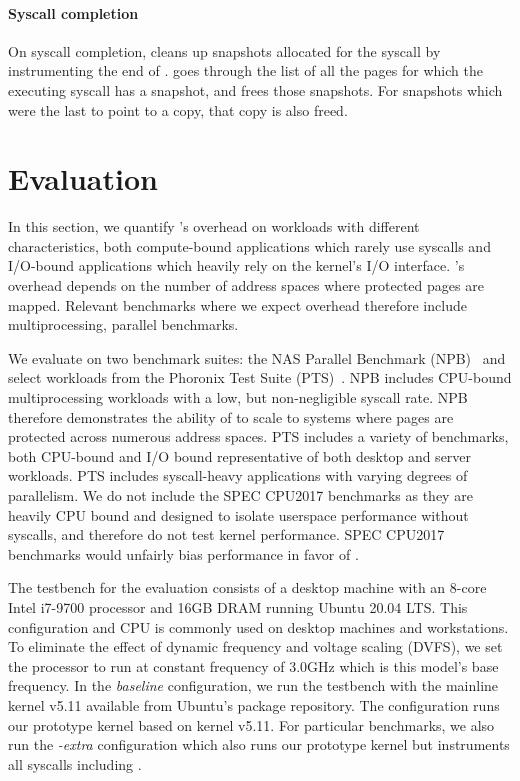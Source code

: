 \documentclass[letterpaper,twocolumn,10pt, anonymous]{article}
\begin{document}
\paragraph{Syscall completion}
On syscall completion, \tiktok cleans up snapshots allocated for 
the syscall by instrumenting the end of .
\tiktok goes through the list of all the pages for which the 
executing syscall has a snapshot, and frees those snapshots.
For snapshots which were the last to point to a copy, that 
copy is also freed.


\section{Evaluation}

In this section, we quantify \tiktok's overhead on workloads 
with different characteristics, both compute-bound applications
which rarely use syscalls and I/O-bound applications which 
heavily rely on the kernel's I/O interface.
\tiktok's overhead depends on the number of address spaces 
where protected pages are mapped. 
Relevant benchmarks where we expect overhead therefore include multiprocessing,
parallel benchmarks.

We evaluate \tiktok on two benchmark suites: the NAS Parallel 
Benchmark (NPB)~\cite{npb} and select workloads from the 
Phoronix Test Suite (PTS)~\cite{pts}. 
NPB includes CPU-bound multiprocessing workloads with a 
low, but non-negligible syscall rate. 
NPB therefore demonstrates the ability of \tiktok to 
scale to systems where pages are protected across numerous 
address spaces.
PTS includes a variety of benchmarks, both CPU-bound and 
I/O bound representative of both desktop and server workloads.
PTS includes syscall-heavy applications with varying degrees 
of parallelism.
We do not include the SPEC CPU2017 benchmarks
as they are heavily CPU bound and designed to isolate userspace 
performance without syscalls, and therefore do not test kernel 
performance. SPEC CPU2017 benchmarks would unfairly bias performance in favor of
\tiktok.

The testbench for the evaluation consists of a desktop machine 
with an 8-core Intel i7-9700 processor and 16GB DRAM running 
Ubuntu 20.04 LTS. This configuration and CPU is commonly used on desktop
machines and workstations.
%
To eliminate the effect of dynamic frequency and voltage 
scaling (DVFS), we set the processor to run at constant 
frequency of 3.0GHz which is this model's base frequency.
In the \emph{baseline} configuration, we run the testbench 
with the mainline kernel v5.11 available from Ubuntu's package 
repository.
The \emph{\tiktok} configuration runs our prototype \tiktok kernel 
based on kernel v5.11.
For particular benchmarks, we also run the \emph{\tiktok-extra}
configuration which also runs our prototype \tiktok kernel
but instruments all syscalls including .
\end{document}
